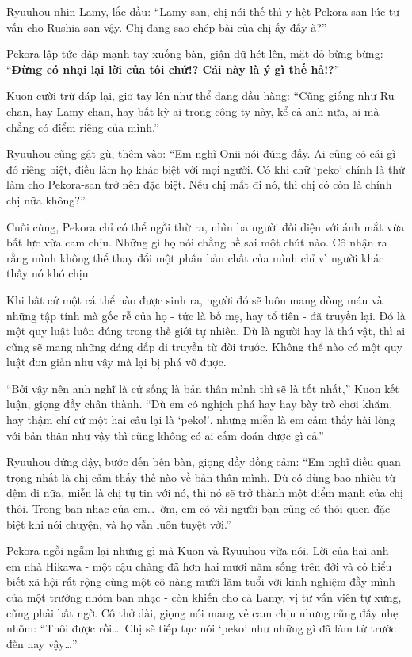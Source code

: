\documentclass[../main.tex]{subfiles}
\begin{document}
Ryuuhou nhìn Lamy, lắc đầu: ``Lamy-san, chị nói thế thì y hệt Pekora-san lúc tư vấn cho Rushia-san vậy. Chị đang sao chép bài của chị ấy đấy à?''

Pekora lập tức đập mạnh tay xuống bàn, giận dữ hét lên, mặt đỏ bừng bừng: ``\textbf{Đừng có nhại lại lời của tôi chứ!? Cái này là ý gì thế hả!?}''

Kuon cười trừ đáp lại, giơ tay lên như thể đang đầu hàng: ``Cũng giống như Ru-chan, hay Lamy-chan, hay bất kỳ ai trong công ty này, kể cả anh nữa, ai mà chẳng có điểm riêng của mình.''

Ryuuhou cũng gật gù, thêm vào: ``Em nghĩ Onii nói đúng đấy. Ai cũng có cái gì đó riêng biệt, điều làm họ khác biệt với mọi người. Có khi chữ `peko' chính là thứ làm cho Pekora-san trở nên đặc biệt. Nếu chị mất đi nó, thì chị có còn là chính chị nữa không?''

Cuối cùng, Pekora chỉ có thể ngồi thừ ra, nhìn ba người đối diện với ánh mắt vừa bất lực vừa cam chịu. Những gì họ nói chẳng hề sai một chút nào. Cô nhận ra rằng mình không thể thay đổi một phần bản chất của mình chỉ vì người khác thấy nó khó chịu.

Khi bất cứ một cá thể nào được sinh ra, người đó sẽ luôn mang dòng máu và những tập tính mà gốc rễ của họ - tức là bố mẹ, hay tổ tiên - đã truyền lại. Đó là một quy luật luôn đúng trong thế giới tự nhiên. Dù là người hay là thú vật, thì ai cũng sẽ mang những dáng dấp di truyền từ đời trước. Không thể nào có một quy luật đơn giản như vậy mà lại bị phá vỡ được.

``Bởi vậy nên anh nghĩ là cứ sống là bản thân mình thì sẽ là tốt nhất,'' Kuon kết luận, giọng đầy chân thành. ``Dù em có nghịch phá hay hay bày trò chơi khăm, hay thậm chí cứ một hai câu lại là `peko!', nhưng miễn là em cảm thấy hài lòng với bản thân như vậy thì cũng không có ai cấm đoán được gì cả.''

Ryuuhou đứng dậy, bước đến bên bàn, giọng đầy đồng cảm: ``Em nghĩ điều quan trọng nhất là chị cảm thấy thế nào về bản thân mình. Dù có dùng bao nhiêu từ đệm đi nữa, miễn là chị tự tin với nó, thì nó sẽ trở thành một điểm mạnh của chị thôi. Trong ban nhạc của em\dots\ ờm, em có vài người bạn cũng có thói quen đặc biệt khi nói chuyện, và họ vẫn luôn tuyệt vời.''

Pekora ngồi ngẫm lại những gì mà Kuon và Ryuuhou vừa nói. Lời của hai anh em nhà Hikawa - một cậu chàng đã hơn hai mươi năm sống trên đời và có hiểu biết xã hội rất rộng cùng một cô nàng mười lăm tuổi với kinh nghiệm đầy mình của một trưởng nhóm ban nhạc - còn khiến cho cả Lamy, vị tư vấn viên tự xưng, cũng phải bất ngờ. Cô thở dài, giọng nói mang vẻ cam chịu nhưng cũng đầy nhẹ nhõm: ``Thôi được rồi\dots\ Chị sẽ tiếp tục nói `peko' như những gì đã làm từ trước đến nay vậy\dots''
\end{document}
